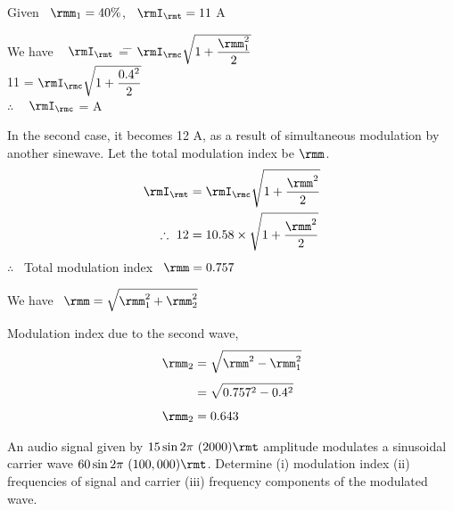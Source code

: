 \begin{solution}
Given ~$\rmm_1 = 40\%$, ~$\rmI_\rmt = 11$ A
\begin{tabbing}
We have ~ $\rmI_\rmt$ \= = \= $\rmI_\rmc \sqrt{1+\dfrac{\rmm^2_1}{2}}$\\[4pt]
\hspace{1.4cm} 11 \> = \> $\rmI_\rmc \sqrt{1+\dfrac{0.4^2}{2}}$\\[4pt]  
\hspace{1cm} $\therefore$ ~ $\rmI_\rmc$ \> =  A
\end{tabbing}

In the second case, it becomes 12 A, as a result of simultaneous
modulation by another sinewave. Let the total modulation index be $\rmm$.
\begin{align*}
\rmI_\rmt & = \rmI_\rmc \sqrt{1 + \dfrac{\rmm^2}{2}}\\
\therefore ~ 12 & = 10.58 \times \sqrt{1+\frac{\rmm^2}{2}}
\end{align*}
$\therefore $~ Total modulation index ~$\rmm = 0.757$

\smallskip
We have ~$\rmm = \sqrt{\rmm^2_1 + \rmm^2_2}$

\smallskip
Modulation index due to the second wave,
\begin{align*}
\rmm_2 & = \sqrt{\rmm^2 -\rmm^2_1}\\[4pt]
& = \sqrt{0.757^2 -0.4^2}\\[4pt]
\rmm_2 & = 0.643
\end{align*}
\end{solution}

\eject

\begin{problem}\label{prob8.17}
An audio signal given by $15 \sin 2\pi ~(2000)\rmt$ amplitude
modulates a sinusoidal carrier wave $60 \sin
2 \pi~(100,000)\rmt$. Determine (i) modulation index (ii) frequencies of
signal and carrier (iii) frequency components of the modulated wave. 
\end{problem}

